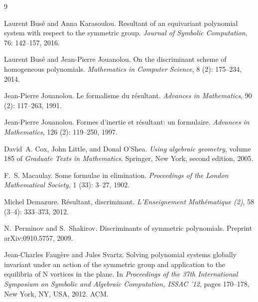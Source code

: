 \documentclass[12pt]{amsart}
\theoremstyle{definition}
\begin{document}
\begin{thebibliography}{9}
\providecommand{\natexlab}[1]{#1}

Laurent Bus\'e and Anna Karasoulou.
\newblock Resultant of an equivariant polynomial system with respect to the
  symmetric group.
\newblock \emph{Journal of Symbolic Computation}, 76: 142--157, 2016.

Laurent Bus\'e and Jean-Pierre Jouanolou.
\newblock On the discriminant scheme of homogeneous polynomials.
\newblock \emph{Mathematics in Computer Science}, 8 (2):
  175--234, 2014.

Jean-Pierre Jouanolou.
\newblock Le formalisme du r\'esultant.
\newblock \emph{Advances in Mathematics}, 90 (2): 117--263,
  1991.

Jean-Pierre Jouanolou.
\newblock Formes d'inertie et r\'esultant: un formulaire.
\newblock \emph{Advances in Mathematics}, 126 (2): 119--250,
  1997.

David~A. Cox, John Little, and Donal O'Shea.
\newblock \emph{Using algebraic geometry}, volume 185 of \emph{Graduate Texts
  in Mathematics}.
\newblock Springer, New York, second edition, 2005.

F.~S. Macaulay.
\newblock Some formulae in elimination.
\newblock \emph{Proceedings of the London Mathematical Society}, 1
  (33): 3--27, 1902.

Michel Demazure.
\newblock R\'esultant, discriminant.
\newblock \emph{L'Enseignement Math\'ematique (2)}, 58
  (3--4): 333--373, 2012.

N.~Perminov and S.~Shakirov.
\newblock Discriminants of symmetric polynomials.
\newblock Preprint arXiv:0910.5757, 2009.

Jean-Charles Faug\`ere and Jules Svartz.
\newblock Solving polynomial systems globally invariant under an action of the
  symmetric group and application to the equilibria of {N} vortices in the
  plane.
\newblock In \emph{Proceedings of the 37th International Symposium on Symbolic
  and Algebraic Computation, ISSAC '12}, pages 170--178, New York, NY, USA,
  2012. ACM.

\end{thebibliography}
\end{document}
